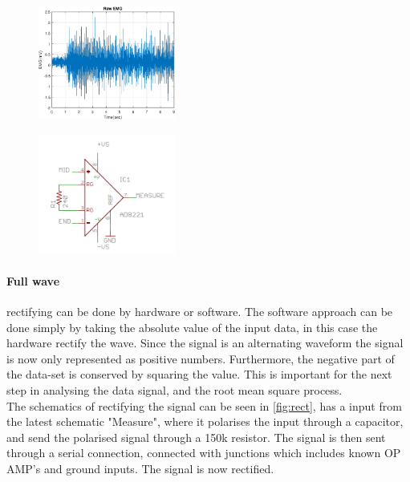 \begin{multicols}{2}  
\begin{figure}[H]
    \centering
    \includegraphics[width=0.4\textwidth]{Figures/EMG/epsFigRAW}
    \caption{}
\end{figure} 
\columnbreak
\begin{figure}[H]
    \centering
    \includegraphics[width=0.4\textwidth]{Figures/EMG/AmpGB.PNG}
    \caption{\cite{SparkfunScematicEMG}}
    \label{fig:GainsEMG}
\end{figure} 
\end{multicols}

\paragraph{Full wave}
rectifying can be done by hardware or software. The software approach can be done simply by taking the absolute value  of the input data, in this case the hardware rectify the wave\cite{RMS}. Since the signal is an alternating waveform the signal is now only represented as positive numbers. Furthermore, the negative part of the data-set is conserved by squaring the value. This is important for the next step in analysing the data signal, and the root mean square process.\\
The schematics of rectifying the signal can be seen in \ref{fig:rect}, has a input from the latest schematic "Measure", where it polarises the input through a capacitor, and send the polarised signal through a 150k resistor. The signal is then sent through a serial connection, connected with junctions which includes known OP AMP's and ground inputs. The signal is now rectified.\\

